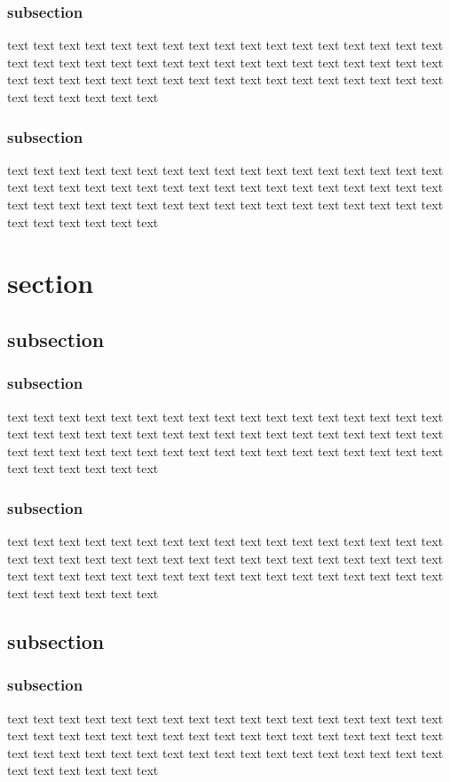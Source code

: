 \documentclass[report, backcover, english, nodocumentinfo]{upmethodology-document}
\begin{document}
				\subsubsection{subsection}
						text text text text text text text text text text text text text text text text text text text text text text text text text text text text text text text text text text text text text text text text text text text text text text text text text text text text text text text text text
				\subsubsection{subsection}
						text text text text text text text text text text text text text text text text text text text text text text text text text text text text text text text text text text text text text text text text text text text text text text text text text text text text text text text text text
		\section{section}
			\subsection{subsection}
				\subsubsection{subsection}
						text text text text text text text text text text text text text text text text text text text text text text text text text text text text text text text text text text text text text text text text text text text text text text text text text text text text text text text text text
				\subsubsection{subsection}
						text text text text text text text text text text text text text text text text text text text text text text text text text text text text text text text text text text text text text text text text text text text text text text text text text text text text text text text text text
			\subsection{subsection}
				\subsubsection{subsection}
						text text text text text text text text text text text text text text text text text text text text text text text text text text text text text text text text text text text text text text text text text text text text text text text text text text text text text text text text text
\end{document}
